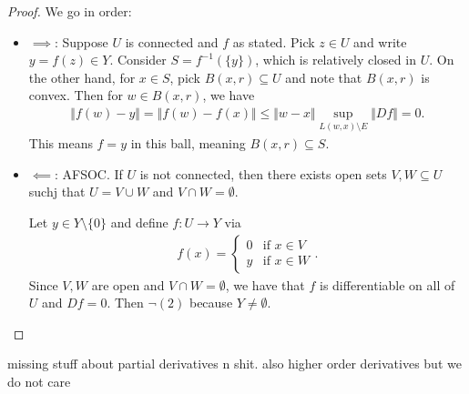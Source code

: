\documentclass{report}
\begin{document}
\begin{proof}
    We go in order:
    \begin{itemize}
        \item $\implies$: Suppose $U$ is connected and $f$ as stated. Pick $z \in U$ and write $y = f(z) \in Y$. Consider $S = f^{-1}(\{y\})$, which is relatively closed in $U$. On the other hand, for $x \in S$, pick $B(x, r) \subseteq U$ and note that $B(x, r)$ is convex. Then for $w \in B(x, r)$, we have 
        \begin{align*}
            \Vert f(w) - y\Vert = \Vert f(w) - f(x) \Vert \leq \Vert w -x \Vert \sup_{L(w, x) \setminus E} \Vert Df\Vert = 0.
        \end{align*}
        This means $f = y$ in this ball, meaning $B(x, r) \subseteq S$.
        \item $\impliedby$: AFSOC. If $U$ is not connected, then there exists open sets $V,W \subseteq U$ suchj that $U = V \cup W$ and $V \cap W = \emptyset$. 
        
        Let $y \in Y \setminus \{0\}$ and define $f : U \to Y$ via
        \begin{align*}
            f(x) = \begin{cases}
                0 & \text{if } x \in V \\
                y & \text{if } x \in W
            \end{cases}.
        \end{align*}
        Since $V,W$ are open and $V \cap W = \emptyset$, we have that $f$ is differentiable on all of $U$ and $Df = 0$. Then $\neg (2)$ because $Y \neq \emptyset$. 
    \end{itemize}
\end{proof}
missing stuff about partial derivatives n shit. also higher order derivatives but we do not care
\end{document}
